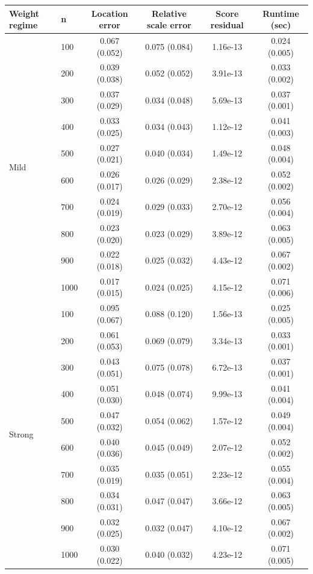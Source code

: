 \begin{tabular}{llcccc}
\hline
Weight regime & n & Location error & Relative scale error & Score residual & Runtime (sec) \\
\hline
\multirow{10}{*}{Mild} & 100 & 0.067 (0.052) & 0.075 (0.084) & 1.16e-13 & 0.024 (0.005) \\
 & 200 & 0.039 (0.038) & 0.052 (0.052) & 3.91e-13 & 0.033 (0.002) \\
 & 300 & 0.037 (0.029) & 0.034 (0.048) & 5.69e-13 & 0.037 (0.001) \\
 & 400 & 0.033 (0.025) & 0.034 (0.043) & 1.12e-12 & 0.041 (0.003) \\
 & 500 & 0.027 (0.021) & 0.040 (0.034) & 1.49e-12 & 0.048 (0.004) \\
 & 600 & 0.026 (0.017) & 0.026 (0.029) & 2.38e-12 & 0.052 (0.002) \\
 & 700 & 0.024 (0.019) & 0.029 (0.033) & 2.70e-12 & 0.056 (0.004) \\
 & 800 & 0.023 (0.020) & 0.023 (0.029) & 3.89e-12 & 0.063 (0.005) \\
 & 900 & 0.022 (0.018) & 0.025 (0.032) & 4.43e-12 & 0.067 (0.002) \\
 & 1000 & 0.017 (0.015) & 0.024 (0.025) & 4.15e-12 & 0.071 (0.006) \\
\hline
\multirow{10}{*}{Strong} & 100 & 0.095 (0.067) & 0.088 (0.120) & 1.56e-13 & 0.025 (0.005) \\
 & 200 & 0.061 (0.053) & 0.069 (0.079) & 3.34e-13 & 0.033 (0.001) \\
 & 300 & 0.043 (0.051) & 0.075 (0.078) & 6.72e-13 & 0.037 (0.001) \\
 & 400 & 0.051 (0.030) & 0.048 (0.074) & 9.99e-13 & 0.041 (0.004) \\
 & 500 & 0.047 (0.032) & 0.054 (0.062) & 1.57e-12 & 0.049 (0.004) \\
 & 600 & 0.040 (0.036) & 0.045 (0.049) & 2.07e-12 & 0.052 (0.002) \\
 & 700 & 0.035 (0.019) & 0.035 (0.051) & 2.23e-12 & 0.055 (0.004) \\
 & 800 & 0.034 (0.031) & 0.047 (0.047) & 3.66e-12 & 0.063 (0.005) \\
 & 900 & 0.032 (0.025) & 0.032 (0.047) & 4.10e-12 & 0.067 (0.002) \\
 & 1000 & 0.030 (0.022) & 0.040 (0.032) & 4.23e-12 & 0.071 (0.005) \\
\hline
\end{tabular}
